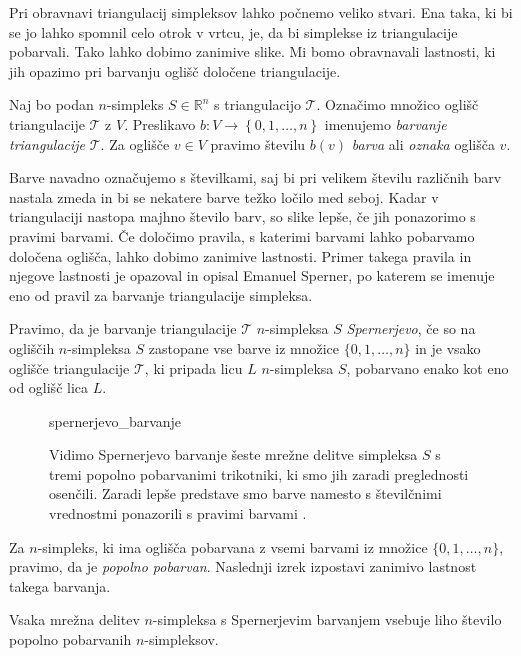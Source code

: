 \documentclass[mat1]{fmfdelo}
\newcommand{\R}{\mathbb R}
\newcommand{\0}{0}
\newcommand{\pT}{\mathcal T}
\begin{document}
Pri obravnavi triangulacij simpleksov lahko počnemo veliko stvari. Ena taka, ki bi se jo lahko spomnil celo otrok v vrtcu, je, da bi simplekse iz triangulacije pobarvali. Tako lahko dobimo zanimive slike. Mi bomo obravnavali lastnosti, ki jih opazimo pri barvanju oglišč določene triangulacije.
\begin{definicija}
Naj bo podan $n$-simpleks $S \in \R^n$ s triangulacijo $\pT$. Označimo množico oglišč triangulacije $\pT$ z $V$. Preslikavo $b : V \to \left \{0, 1, \dots, n \right \} $ imenujemo \emph{barvanje triangulacije} $\pT$. Za oglišče $v \in V$ pravimo številu $b(v)$ \emph{barva} ali \emph{oznaka} oglišča $v$.
\end{definicija}
Barve navadno označujemo s številkami, saj bi pri velikem številu različnih barv nastala zmeda in bi se nekatere barve težko ločilo med seboj. Kadar v triangulaciji nastopa majhno število barv, so slike lepše, če jih ponazorimo s pravimi barvami. Če določimo pravila, s katerimi barvami lahko pobarvamo določena oglišča, lahko dobimo zanimive lastnosti. Primer takega pravila in njegove lastnosti je opazoval in opisal Emanuel Sperner, po katerem se imenuje eno od pravil za barvanje triangulacije simpleksa.
\begin{definicija}
Pravimo, da je barvanje triangulacije $\pT$ $n$-simpleksa $S$ \emph{Spernerjevo}, če so na ogliščih $n$-simpleksa $S$ zastopane vse barve iz množice $\{ 0, 1, \dots, n \}$ in je vsako oglišče triangulacije $\pT$, ki pripada licu $L$ $n$-simpleksa $S$, pobarvano enako kot eno od oglišč lica $L$.
\end{definicija}
\begin{figure}[h!]    
	\centering
		{spernerjevo_barvanje}
	\caption{Vidimo Spernerjevo barvanje šeste mrežne delitve simpleksa $S$ s tremi popolno pobarvanimi trikotniki, ki smo jih zaradi preglednosti osenčili. Zaradi lepše predstave smo barve namesto s številčnimi vrednostmi ponazorili s pravimi barvami .}
\end{figure}
Za $n$-simpleks, ki ima oglišča pobarvana z vsemi barvami iz množice $\{ 0, 1, \dots, n \}$, pravimo, da je \emph{popolno pobarvan}. Naslednji izrek izpostavi zanimivo lastnost takega barvanja.
\begin{lema}\label{izr:sperner}
Vsaka mrežna delitev $n$-simpleksa s Spernerjevim barvanjem vsebuje liho število popolno pobarvanih $n$-simpleksov.
\end{lema}
\end{document}
